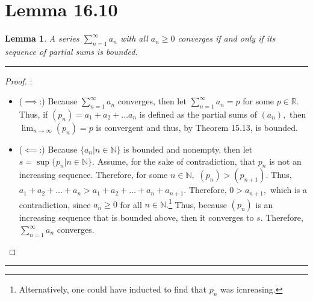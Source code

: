 \documentclass[openany, amssymb, psamsfonts]{amsart}
\newcommand{\bbN}{\mathbb{N}}
\newcommand{\bbR}{\mathbb{R}}
\newtheorem{lem}{Lemma}[section]
\theoremstyle{definition}
\numberwithin{equation}{section}
\begin{document}
\section*{Lemma 16.10}
\begin{lem}
\label{16.10}
	A series $\displaystyle \sum\limits_{n = 1}^{\infty} a_n$ with all $a_n \geq 0$ converges if and only if its sequence of partial sums is bounded.
\end{lem}
\vspace{4pt}     \hrule   \vspace{4pt}\begin{proof}:\\
\begin{itemize}
    \item ($\implies$:) Because $\displaystyle \sum\limits_{n = 1}^{\infty} a_n$ converges, then let $\displaystyle \sum\limits_{n = 1}^{\infty} a_n = p$ for some $p \in \bbR.$ Thus, if $(p_n) = a_1 + a_2 + \dots a_n$ is defined as the partial sums of $(a_n),$ then $\lim_{n\to \infty}(p_n) = p$ is convergent and thus, by Theorem 15.13, is bounded.
    \item ($\impliedby$:) Because $\{a_n | n \in \bbN\}$ is bounded and nonempty, then let $s = \sup\{p_n | n \in \bbN\}.$ Assume, for the sake of contradiction, that $p_n$ is not an increasing sequence. Therefore, for some $n \in \bbN,$ $(p_n)> (p_{n+1}).$ Thus, $a_1 + a_2 + \dots + a_n > a_1 + a_2 + \dots + a_n + a_{n+1}.$ Therefore, $0>a_{n+1},$ which is a contradiction, since $a_n\geq 0$ for all $n \in \bbN.$\footnote{Alternatively, one could have inducted to find that $p_n$ was icnreasing.} Thus, because $(p_n)$ is an increasing sequence that is bounded above, then it converges to $s.$ Therefore, $\displaystyle \sum\limits_{n = 1}^{\infty} a_n$ converges.
\end{itemize}
    
\end{proof}\vspace{4pt}     \hrule   \vspace{4pt}
\end{document}
